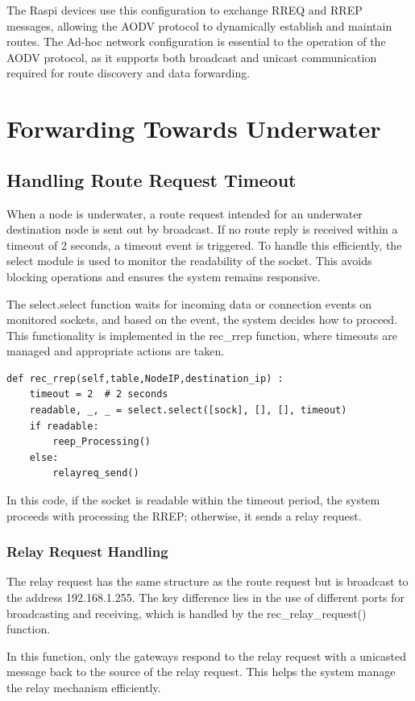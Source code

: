 \documentclass[]{nsm-thesis}
\begin{document}
The Raspi devices use this configuration to exchange RREQ and RREP messages, allowing the AODV protocol to dynamically establish and maintain routes. The Ad-hoc network configuration is essential to the operation of the AODV protocol, as it supports both broadcast and unicast communication required for route discovery and data forwarding.
\section{Forwarding Towards Underwater}
\subsection{Handling Route Request Timeout}
When a node is underwater, a route request intended for an underwater destination node is sent out by broadcast. If no route reply is received within a timeout of 2 seconds, a timeout event is triggered. To handle this efficiently, the select module is used to monitor the readability of the socket. This avoids blocking operations and ensures the system remains responsive.

The select.select function waits for incoming data or connection events on monitored sockets, and based on the event, the system decides how to proceed. This functionality is implemented in the rec\_rrep function, where timeouts are managed and appropriate actions are taken.

\begin{lstlisting}[caption={Route Request Timeout}, label={lst:example}]
def rec_rrep(self,table,NodeIP,destination_ip) :
    timeout = 2  # 2 seconds
    readable, _, _ = select.select([sock], [], [], timeout)
    if readable:
        reep_Processing()
    else:
        relayreq_send()
\end{lstlisting}
In this code, if the socket is readable within the timeout period, the system proceeds with processing the RREP; otherwise, it sends a relay request.
\subsubsection{Relay Request Handling}
The relay request has the same structure as the route request but is broadcast to the address 192.168.1.255. The key difference lies in the use of different ports for broadcasting and receiving, which is handled by the rec\_relay\_request() function.

In this function, only the gateways respond to the relay request with a unicasted message back to the source of the relay request. This helps the system manage the relay mechanism efficiently.
\end{document}
